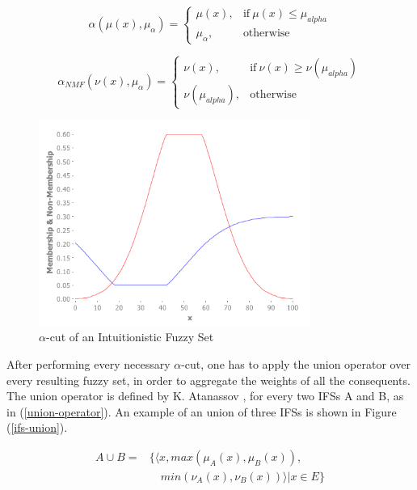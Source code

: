 \documentclass[conference]{IEEEtran}
\begin{document}
\begin{equation}
  \label{alpha-cut}
  \alpha(\mu (x),\mu_{\alpha}) =
  \begin{cases}
    \mu (x), & \text{if}\ \mu (x) \leq \mu_{alpha}  \\
    \mu_{\alpha}, & \text{otherwise}
  \end{cases}
\end{equation}

\begin{equation}
  \label{nmf-alpha-cut}
  \alpha_{NMF}(\nu (x),\mu_{\alpha}) =
  \begin{cases}
    \nu (x), & \text{if}\ \nu (x) \geq \nu (\mu_{alpha})  \\
    \nu (\mu_{alpha}), & \text{otherwise}
  \end{cases}
\end{equation}

\begin{figure}[!t]
  \centering
  \includegraphics[width=3.5in]{alpha-cut}
  \caption{$\alpha$-cut of an Intuitionistic Fuzzy Set}
  \label{alpha-cut-example}
\end{figure}

After performing every necessary $\alpha$-cut, one has to apply the
union operator over every resulting fuzzy set, in order to aggregate
the weights of all the consequents. The union operator is defined by
K. Atanassov \cite{atanassov2013intuitionistic}, for every two IFSs A
and B, as in (\ref{union-operator}). An example of an union of three
IFSs is shown in Figure (\ref{ifs-union}).

\begin{equation}
  \label{union-operator}
  \begin{aligned}
    A \cup B  = &\{ \langle x, max(\mu_{A} (x), \mu_{B} (x)),\\
    &\quad min(\nu_{A} (x), \nu_{B} (x)) \rangle | x \in E \}
\end{aligned}
\end{equation}
\end{document}
